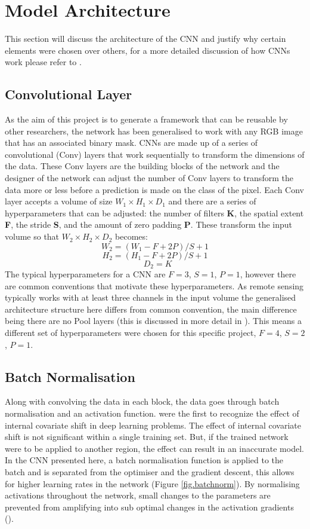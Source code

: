 \section{Model Architecture}\label{sec.model_architecture}
This section will discuss the architecture of the CNN and justify why certain elements were chosen over others, for a more detailed discussion of how CNNs work please refer to \cite{Richmond19b}.
\subsection{Convolutional Layer}
As the aim of this project is to generate a framework that can be reusable by other researchers, the network has been generalised to work with any RGB image that has an associated binary mask. CNNs are made up of a series of convolutional (Conv) layers that work sequentially to transform the dimensions of the data. These Conv layers are the building blocks of the network and the designer of the network can adjust the number of Conv layers to transform the data more or less before a prediction is made on the class of the pixel. Each Conv layer accepts a volume of size\textbf{ $W_1\times H_1\times D_1$} and there are a series of hyperparameters that can be adjusted: the number of filters \textbf{K}, the spatial extent \textbf{F}, the stride \textbf{S}, and the amount of zero padding \textbf{P}. These transform the input volume so that \textbf{$W_2\times H_2\times D_2$} becomes: 
\[\textbf{$W_2 = (W_1 - F + 2P)/S + 1$}\] \[\textbf{$H_2 = (H_1 - F + 2P)/S + 1$}\]\[\textbf{ $D_2 = K$}\]
The typical hyperparameters for a CNN are $F = 3$, $S = 1$, $P = 1$, however there are common conventions that motivate these hyperparameters. As remote sensing typically works with at least three channels in the input volume the generalised architecture structure here differs from common convention, the main difference being there are no Pool layers (this is discussed in more detail in \citet{Richmond19b}). This means a different set of hyperparameters were chosen for this specific project, $F = 4$, $S = 2$, $P = 1$. 
\subsection{Batch Normalisation}
Along with convolving the data in each block, the data goes through batch normalisation and an activation function. \citet{ioffe15} were the first to recognize the effect of internal covariate shift in deep learning problems. The effect of internal covariate shift is not significant within a single training set. But, if the trained network were to be applied to another region, the effect can result in an inaccurate model. In the CNN presented here, a batch normalisation function is applied to the batch and is separated from the optimiser and the gradient descent, this allows for higher learning rates in the network (Figure \ref{fig.batchnorm}). By normalising activations throughout the network, small changes to the parameters are prevented from amplifying into sub optimal changes in the activation gradients (\cite{ioffe15}). 

